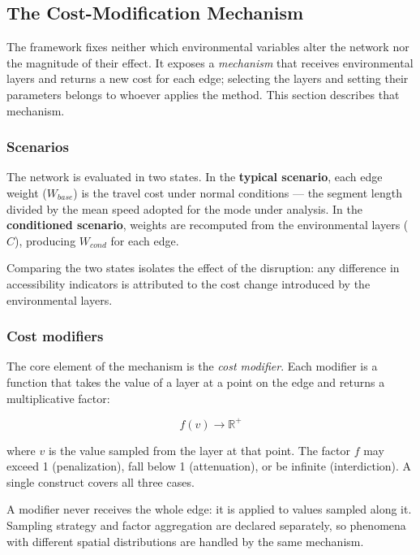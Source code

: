 \subsection{The Cost-Modification Mechanism}
\label{sec:penalization}

The framework fixes neither which environmental variables alter the network nor the magnitude of their effect. It exposes a \emph{mechanism} that receives environmental layers and returns a new cost for each edge; selecting the layers and setting their parameters belongs to whoever applies the method. This section describes that mechanism.

\subsubsection{Scenarios}

The network is evaluated in two states. In the \textbf{typical scenario}, each edge weight ($W_{base}$) is the travel cost under normal conditions — the segment length divided by the mean speed adopted for the mode under analysis. In the \textbf{conditioned scenario}, weights are recomputed from the environmental layers ($C$), producing $W_{cond}$ for each edge.

Comparing the two states isolates the effect of the disruption: any difference in accessibility indicators is attributed to the cost change introduced by the environmental layers.

\subsubsection{Cost modifiers}

The core element of the mechanism is the \emph{cost modifier}. Each modifier is a function that takes the value of a layer at a point on the edge and returns a multiplicative factor:

\begin{equation}
  f(v) \rightarrow \mathbb{R}^{+}
\end{equation}

where $v$ is the value sampled from the layer at that point. The factor $f$ may exceed 1 (penalization), fall below 1 (attenuation), or be infinite (interdiction). A single construct covers all three cases.

A modifier never receives the whole edge: it is applied to values sampled along it. Sampling strategy and factor aggregation are declared separately, so phenomena with different spatial distributions are handled by the same mechanism.

